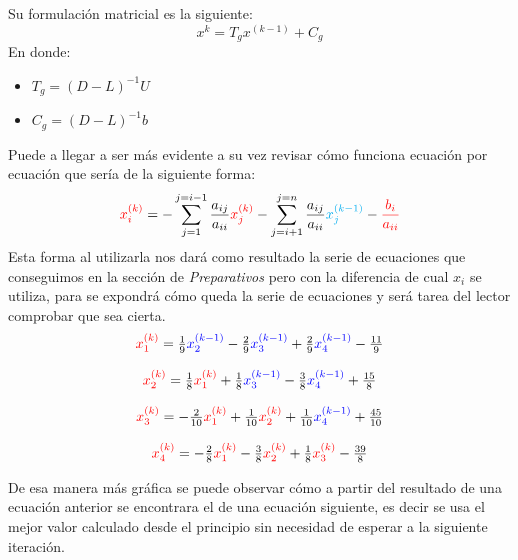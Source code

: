 \documentclass{article}
\begin{document}
Su formulación matricial es la siguiente:
\begin{equation*}
   x^{k} = T_gx^{(k-1)} + C_g
\end{equation*}
En donde:
\begin{itemize}
   \item $T_g = (D-L)^{-1}U$
   \item $C_g = (D-L)^{-1}b$
\end{itemize}
Puede a llegar a ser más evidente a su vez revisar cómo funciona ecuación por ecuación que sería de la siguiente
forma:
\begin{equation*}
   \textcolor{red}{x_i^{(k)}} = - \sum_{j=1}^{j=i-1}\frac{a_{ij}}{a_{ii}} \textcolor{red}{x_j^{(k)}} - \sum_{j = i+1}^{j = n}\frac{a_{ij}}{a_{ii}}\textcolor{cyan}{x_j^{(k-1)}} - \textcolor{red}{\frac{b_i}{a_{ii}}}
\end{equation*}
Esta forma al utilizarla nos dará como resultado la serie de ecuaciones que conseguimos en la sección de \emph{Preparativos} pero con la
diferencia de cual $x_i$ se utiliza, para se expondrá cómo queda la serie de ecuaciones y será tarea del lector comprobar que sea cierta.
\begin{equation*}
   \begin{matrix}
       \textcolor{red}{x_1^{(k)}} = \frac{1}{9}\textcolor{blue}{x_2^{(k-1)}} - \frac{2}{9}\textcolor{blue}{x_3^{(k-1)}} +\frac{2}{9} \textcolor{blue}{x_4^{(k-1)}}- \frac{11}{9}\\
       \\
       \textcolor{red}{x_2^{(k)}}  = \frac{1}{8}\textcolor{red}{x_1^{(k)}}  + \frac{1}{8}\textcolor{blue}{x_3^{(k-1)}} - \frac{3}{8}\textcolor{blue}{x_4^{(k-1)}} + \frac{15}{8}\\
       \\
       \textcolor{red}{x_3^{(k)}}  = -\frac{2}{10}\textcolor{red}{x_1^{(k)}} + \frac{1}{10}\textcolor{red}{x_2^{(k)}} + \frac{1}{10}\textcolor{blue}{x_4^{(k-1)}} + \frac{45}{10}\\
       \\
       \textcolor{red}{x_4^{(k)}}  = - \frac{2}{8}\textcolor{red}{x_1^{(k)}} - \frac{3}{8}\textcolor{red}{x_2^{(k)}} + \frac{1}{8}\textcolor{red}{x_3^{(k)}}  - \frac{39}{8}
   \end{matrix}
\end{equation*}


De esa manera más gráfica se puede observar cómo a partir del resultado de una ecuación anterior se encontrara el de una ecuación siguiente, es decir
se usa el mejor valor calculado desde el principio sin necesidad de esperar a la siguiente iteración.
\end{document}
